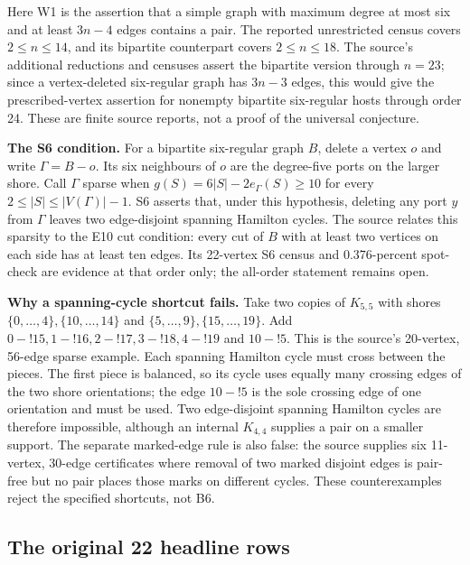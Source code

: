 \documentclass[smallextended]{svjour3}
\newcounter{none} %
\begin{document}
Here W1 is the assertion that a simple graph with maximum degree at most
six and at least \(3n-4\) edges contains a pair. The reported
unrestricted census covers \(2\le n\le14\), and its bipartite
counterpart covers \(2\le n\le18\). The source's additional reductions
and censuses assert the bipartite version through \(n=23\); since a
vertex-deleted six-regular graph has \(3n-3\) edges, this would give the
prescribed-vertex assertion for nonempty bipartite six-regular hosts
through order 24. These are finite source reports, not a proof of the
universal conjecture.

\textbf{The S6 condition.} For a bipartite six-regular graph \(B\),
delete a vertex \(o\) and write \(\Gamma=B-o\). Its six neighbours of
\(o\) are the degree-five ports on the larger shore. Call \(\Gamma\)
sparse when \(g(S)=6|S|-2e_\Gamma(S)\ge10\) for every
\(2\le|S|\le|V(\Gamma)|-1\). S6 asserts that, under this hypothesis,
deleting any port \(y\) from \(\Gamma\) leaves two edge-disjoint
spanning Hamilton cycles. The source relates this sparsity to the E10
cut condition: every cut of \(B\) with at least two vertices on each
side has at least ten edges. Its 22-vertex S6 census and 0.376-percent
spot-check are evidence at that order only; the all-order statement
remains open.

\textbf{Why a spanning-cycle shortcut fails.} Take two copies of
\(K_{5,5}\) with shores \(\{0,\ldots,4\},\{10,\ldots,14\}\) and
\(\{5,\ldots,9\},\{15,\ldots,19\}\). Add
\(0\!-!15,1\!-!16,2\!-!17,3\!-!18,4\!-!19\) and \(10\!-!5\). This is the
source's 20-vertex, 56-edge sparse example. Each spanning Hamilton cycle
must cross between the pieces. The first piece is balanced, so its cycle
uses equally many crossing edges of the two shore orientations; the edge
\(10\!-!5\) is the sole crossing edge of one orientation and must be
used. Two edge-disjoint spanning Hamilton cycles are therefore
impossible, although an internal \(K_{4,4}\) supplies a pair on a
smaller support. The separate marked-edge rule is also false: the source
supplies six 11-vertex, 30-edge certificates where removal of two marked
disjoint edges is pair-free but no pair places those marks on different
cycles. These counterexamples reject the specified shortcuts, not B6.

\subsection{The original 22 headline
rows}\label{the-original-22-headline-rows}
\end{document}
